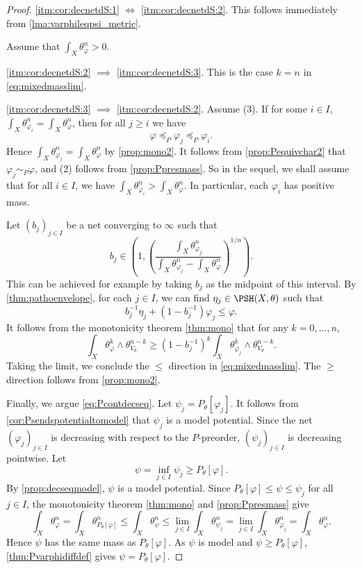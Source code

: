 \begin{proof}
    \ref{itm:cor:decnetdS:1} $\iff$ \ref{itm:cor:decnetdS:2}. This follows immediately from \cref{lma:varphileqpsi_metric}.

    Assume that $\int_X \theta_{\varphi}^n>0$.

    \ref{itm:cor:decnetdS:2} $\implies$ \ref{itm:cor:decnetdS:3}. This is the case $k=n$ in \eqref{eq:mixedmasslim}.

    \ref{itm:cor:decnetdS:3} $\implies$ \ref{itm:cor:decnetdS:2}.
    Assume (3). If for some $i\in I$, $\int_X \theta_{\varphi_i}^n= \int_X \theta_{\varphi}^n$, then for all $j\geq i$ we have
    \[
        \varphi\preceq_P\varphi_j\preceq_P\varphi_i.
    \]
    Hence $\int_X\theta_{\varphi_j}^n=\int_X\theta_{\varphi}^n$ by \cref{prop:mono2}. It follows from \cref{prop:Pequivchar2} that $\varphi_j\sim_P\varphi$, and (2) follows from \cref{prop:Ppresmass}. So in the sequel, we shall assume that for all $i\in I$, we have $\int_X \theta_{\varphi_i}^n>\int_X \theta_{\varphi}^n$.
    In particular, each $\varphi_i$ has positive mass.

    Let $(b_j)_{j\in I}$ be a net converging to $\infty$ such that
    \[
    b_j\in \left( 1, \left(\frac{\int_X \theta_{\varphi_j}^n}{\int_X \theta_{\varphi_j}^n-\int_X \theta_{\varphi}^n}\right)^{1/n} \right).
    \]
    This can be achieved for example by taking $b_j$ as the midpoint of this interval.
    By \cref{thm:pathoenvelope}, for each $j\in I$, we can find $\eta_j\in \PSH(X,\theta)$ such that
    \[
    b_j^{-1}\eta_j +\left(1-b_j^{-1}\right)\varphi_j \leq \varphi.
    \]
    It follows from the monotonicity theorem \cref{thm:mono} that for any $k=0,\ldots,n$,
    \[
    \int_X \theta_{\varphi}^k \wedge \theta_{V_{\theta}}^{n-k}\geq \left(1-b_j^{-1}\right)^k\int_X \theta_{\varphi_j}^k \wedge \theta_{V_{\theta}}^{n-k}.
    \]
    Taking the limit, we conclude the $\leq$ direction in \eqref{eq:mixedmasslim}. The $\geq$ direction follows from \cref{prop:mono2}.

    Finally, we argue \eqref{eq:Pcontdecseq}.
    Let $\psi_j=P_{\theta}[\varphi_j]$. It follows from \cref{cor:Psendspotentialtomodel} that $\psi_j$ is a model potential. Since the net $(\varphi_j)_{j\in I}$ is decreasing with respect to the $P$-preorder, $(\psi_j)_{j\in I}$ is decreasing pointwise. Let
    \[
        \psi=\inf_{j\in I}\psi_j\geq P_{\theta}[\varphi].
    \]
    By \cref{prop:decseqmodel}, $\psi$ is a model potential. Since $P_{\theta}[\varphi]\leq \psi\leq \psi_j$ for all $j\in I$, the monotonicity theorem \cref{thm:mono} and \cref{prop:Ppresmass} give
    \[
        \int_X \theta_{\varphi}^n=\int_X\theta_{P_{\theta}[\varphi]}^n\leq \int_X \theta_{\psi}^n\leq \lim_{j\in I}\int_X \theta_{\psi_j}^n=\lim_{j\in I}\int_X \theta_{\varphi_j}^n=\int_X \theta_{\varphi}^n.
    \]
    Hence $\psi$ has the same mass as $P_{\theta}[\varphi]$. As $\psi$ is model and $\psi\geq P_{\theta}[\varphi]$, \cref{thm:Pvarphidiffdef} gives $\psi=P_{\theta}[\varphi]$.
\end{proof}




